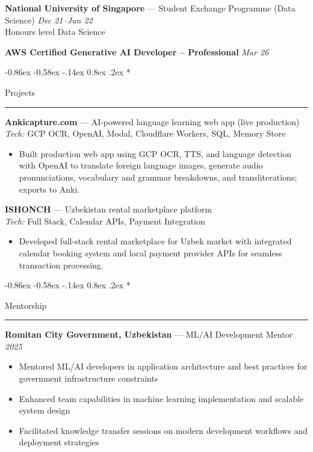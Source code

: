 \documentclass[10pt,letterpaper]{article}
\makeatletter
\renewcommand{\section}{\@startsection{section}{1}{\z@}%
  {-0.86ex \@plus -0.58ex \@minus -.14ex}%
  {0.8ex \@plus.2ex}%
  {\normalfont\large\bfseries}}
\makeatother
\begin{document}
{\bfseries National University of Singapore} — Student Exchange Programme (Data Science) \hfill \textit{Dec 21--Jun 22}\\
Honours level Data Science

{\bfseries AWS Certified Generative AI Developer -- Professional} \hfill \textit{Mar 26}

\section*{Projects\strut}
\hrule\vspace{0.2em}

{\bfseries Ankicapture.com} — AI-powered language learning web app (live production) \hfill \\
\emph{Tech:} GCP OCR, OpenAI, Modal, Cloudflare Workers, SQL, Memory Store\vspace{-0.2em}
\begin{itemize}
  \item Built production web app using GCP OCR, TTS, and language detection with OpenAI to translate foreign language images, generate audio pronunciations, vocabulary and grammar breakdowns, and transliterations; exports to Anki.
\end{itemize}

{\bfseries ISHONCH} — Uzbekistan rental marketplace platform \hfill \\
\emph{Tech:} Full Stack, Calendar APIs, Payment Integration\vspace{-0.2em}
\begin{itemize}
  \item Developed full-stack rental marketplace for Uzbek market with integrated calendar booking system and local payment provider APIs for seamless transaction processing.
\end{itemize}

\section*{Mentorship\strut}
\hrule\vspace{0.2em}

{\bfseries Romitan City Government, Uzbekistan} — ML/AI Development Mentor \hfill \textit{2025}\vspace{-0.2em}
\begin{itemize}
  \item Mentored ML/AI developers in application architecture and best practices for government infrastructure constraints
  \item Enhanced team capabilities in machine learning implementation and scalable system design
  \item Facilitated knowledge transfer sessions on modern development workflows and deployment strategies
\end{itemize}
\end{document}
